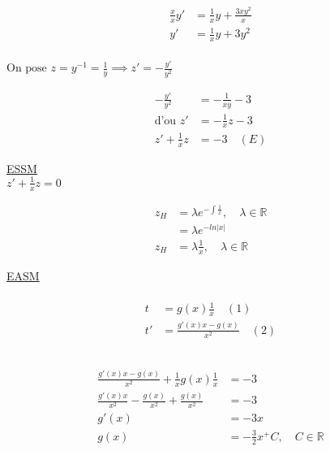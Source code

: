 \begin{align*}
	\frac{x}{x}y' &= \frac{1}{x}y + \frac{3xy^2}{x} \\
	y' &= \frac{1}{x}y + 3y^2 \\
\end{align*}

$\text{On pose } z=y^{-1} = \frac{1}{y} \implies z'= - \frac{y'}{y^2}$

\begin{align*}
	-\frac{y'}{y^2} &= -\frac{1}{xy} - 3 \\
	\text{d'ou } z' &= -\frac{1}{x}z - 3 \\
	z' + \frac{1}{x}z &= -3 \quad (E)
\end{align*}

\underline{ESSM} \\
$z' + \frac{1}{x}z = 0$

\begin{align*}
	z_H &= \lambda e^{-\int \frac{1}{x}}, \quad \lambda \in \mathbb{R} \\
	    &= \lambda e^{-ln|x|} \\
	z_H &= \lambda \frac{1}{x}, \quad \lambda \in \mathbb{R}
\end{align*}

\underline{EASM} \\

 \\
\begin{align*}
	t &= g(x)\frac{1}{x} \quad (1) \\
	t' &= \frac{g'(x)x - g(x)}{x^2} \quad (2)
\end{align*}

 \\
\begin{align*}
	\frac{g'(x)x - g(x)}{x^2} + \frac{1}{x} g(x)\frac{1}{x} &= -3 \\
	\frac{g'(x)x}{x^2} - \frac{g(x)}{x^2} + \frac{g(x)}{x^2} &= -3 \\
	g'(x) &= -3x \\
	g(x) &= -\frac{3}{2}x^ + C, \quad C \in \mathbb{R}
\end{align*}